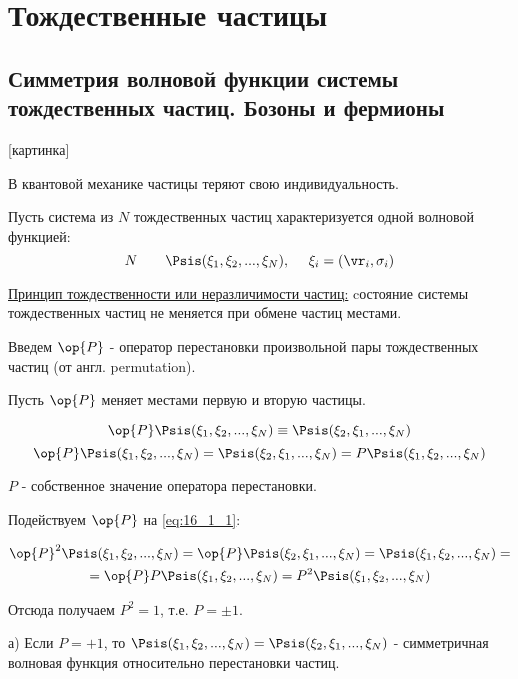 \chapter{Тождественные частицы}

\begin{sloppypar}
\section{Симметрия волновой функции системы тождественных частиц. Бозоны и фермионы}
\end{sloppypar}

[картинка]

В квантовой механике частицы теряют свою индивидуальность.

Пусть система из $N$ тождественных частиц характеризуется одной волновой функцией:
$$
N~~~~~~\Psis(\xi_1, \xi_2, ..., \xi_N ), ~~~~\xi_i = (\vr_i, \sigma_i)
$$

\underline{Принцип тождественности или неразличимости частиц:} cостояние системы тождественных частиц не меняется при обмене частиц местами.

Введем $\op{P}$ - оператор перестановки произвольной пары тождественных частиц (от англ. permutation).

Пусть $\op{P}$ меняет местами первую и вторую частицы.

$$
\op{P} \Psis(\xi_1, \xi_2, ..., \xi_N) \equiv \Psis(\xi_2, \xi_1, ..., \xi_N) \\
$$
\begin{equation}
\label{eq:16_1_1}
\op{P} \Psis(\xi_1, \xi_2, ..., \xi_N) = \Psis(\xi_2, \xi_1, ..., \xi_N) = P \Psis(\xi_1, \xi_2, ..., \xi_N)
\end{equation}

$P$ - собственное значение оператора перестановки.

Подействуем $\op{P}$ на \eqref{eq:16_1_1}:

\begin{gather*}
\op{P}^2 \Psis(\xi_1, \xi_2, ..., \xi_N) = \op{P}\Psis(\xi_2, \xi_1, ..., \xi_N) = \Psis(\xi_1, \xi_2, ..., \xi_N) = \\= \op{P} P\Psis(\xi_1, \xi_2, ..., \xi_N) = P^2 \Psis(\xi_1, \xi_2, ..., \xi_N)
\end{gather*}

Отсюда получаем $P^2 = 1$, т.е. $\boxed{P = \pm 1}$.

а) Если $P = +1$, то $\Psis(\xi_1, \xi_2, ..., \xi_N) = \Psis(\xi_2, \xi_1, ..., \xi_N)$ - симметричная волновая функция относительно перестановки частиц.

